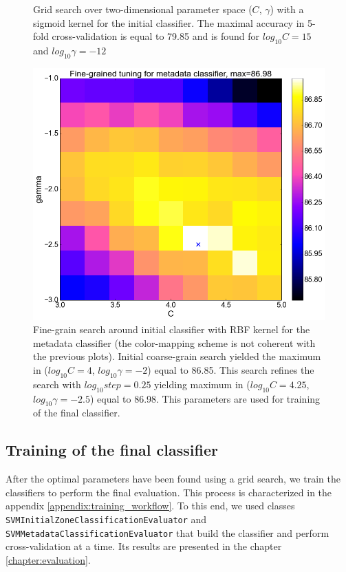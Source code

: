 \begin{center}
\begin{figure}
  \caption{Grid search over two-dimensional parameter space ($C$, $\gamma$) with a sigmoid kernel for the initial classifier. The maximal accuracy in 5-fold cross-validation is equal to 79.85 and is found for $log_{10}C=15$ and $log_{10}\gamma=-12$}
  \label{fig:meta_sigmoid}
\end{figure}
\begin{figure}
	\centering
  \includegraphics[width=\textwidth]{plots/meta_fine}
  \caption{Fine-grain search around initial classifier with RBF kernel for the metadata classifier (the color-mapping scheme is not coherent with the previous plots). Initial coarse-grain search yielded the maximum in ($log_{10}C=4$, $log_{10}\gamma=-2$) equal to 86.85. This search refines the search with $log_{10}step=0.25$ yielding maximum in ($log_{10}C=4.25$, $log_{10}\gamma=-2.5$) equal to 86.98. This parameters are used for training of the final classifier.}
  \label{fig:meta_fine}
\end{figure}
\end{center}

\subsection{Training of the final classifier}
After the optimal parameters have been found using a grid search, we train the classifiers to perform the final evaluation. This process is characterized in the appendix \ref{appendix:training_workflow}. To this end, we used classes \verb+SVMInitialZoneClassificationEvaluator+ and \verb+SVMMetadataClassificationEvaluator+ that build the classifier and perform cross-validation at a time. Its results are presented in the chapter \ref{chapter:evaluation}.

